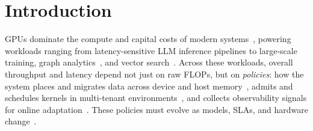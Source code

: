\section{Introduction}



GPUs dominate the compute and capital costs of modern systems~\cite{jeon2019analysis}, powering workloads ranging from latency-sensitive LLM inference pipelines to large-scale training, graph analytics~\cite{lin2024towards,chen2020pangolin}, and vector search~\cite{pan2024survey,cao2023gpu}. Across these workloads, overall throughput and latency depend not just on raw FLOPs, but on \emph{policies}: how the system places and migrates data across device and host memory~\cite{sun2024llumnix,zhong2024distserve,patel2024splitwise,strati2024orion}, admits and schedules kernels in multi-tenant environments~\cite{fu2024serverlessllm,shubha2024usher,hu2023lucid,li2022miso,jayaram2023sia}, and collects observability signals for online adaptation~\cite{agrawal2024vidur}. These policies must evolve as models, SLAs, and hardware change~\cite{agrawal2024taming,yu2024orca,kwon2023efficient}.

